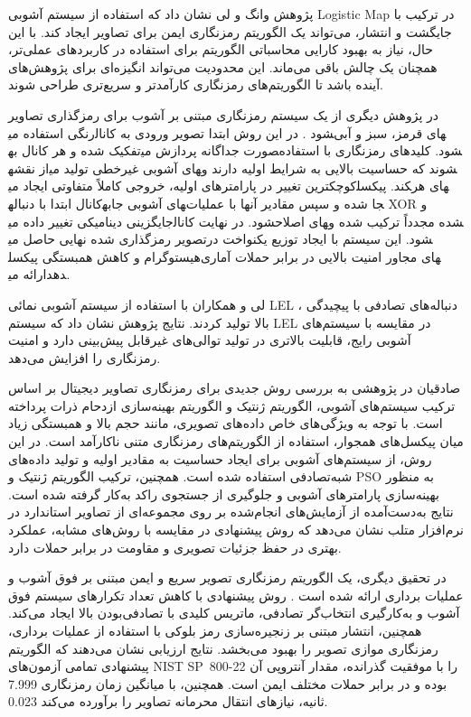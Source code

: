 پژوهش وانگ و لی \cite{ref8} نشان داد که استفاده از سیستم آشوبی ‎Logistic‎ ‎Map‎ در ترکیب با جایگشت و انتشار، می‌تواند یک الگوریتم رمزنگاری ایمن برای تصاویر ایجاد کند. با این حال، نیاز به بهبود کارایی محاسباتی الگوریتم برای استفاده در کاربردهای عملی‌تر، همچنان یک چالش باقی می‌ماند. این محدودیت می‌تواند انگیزه‌ای برای پژوهش‌های آینده باشد تا الگوریتم‌های رمزنگاری کارآمدتر و سریع‌تری طراحی شوند.

در پژوهش دیگری  از یک سیستم رمزنگاری مبتنی بر آشوب برای رمزگذاری تصاویر رنگی استفاده می‎شود \cite{ref9}. در این روش ابتدا تصویر ورودی به کانال‎های قرمز، سبز و آبی تفکیک شده و هر کانال به‎صورت جداگانه پردازش می‎شود. کلیدهای رمزنگاری با استفاده از نقشه‎های آشوبی غیرخطی تولید می‎شوند که حساسیت بالایی به شرایط اولیه دارند و کوچکترین تغییر در پارامترهای اولیه، خروجی کاملاً متفاوتی ایجاد می‎کند. پیکسل‎های هر کانال ابتدا با دنباله‎های آشوبی جابه‎جا شده و سپس مقادیر آنها با عملیات ‎XOR‎ و جایگزینی دینامیکی تغییر داده می‎شود. در نهایت کانال‎های اصلاح‎شده مجدداً ترکیب شده و تصویر رمزگذاری شده نهایی حاصل می‎شود. این سیستم با ایجاد توزیع یکنواخت در هیستوگرام و کاهش همبستگی پیکسل‎های مجاور امنیت بالایی در برابر حملات آماری ارائه می‎دهد.

لی و همکاران \cite{ref10} با استفاده از سیستم آشوبی نمائی ‎LEL‎ ، دنباله‌های تصادفی با پیچیدگی بالا تولید کردند. نتایج پژوهش نشان داد که سیستم ‎LEL‎ در مقایسه با سیستم‌های آشوبی رایج، قابلیت بالاتری در تولید توالی‌های غیرقابل پیش‌بینی دارد و امنیت رمزنگاری را افزایش می‌دهد.

صادقیان \cite{ref11} در پژوهشی به بررسی روش جدیدی برای رمزنگاری تصاویر دیجیتال بر اساس ترکیب سیستم‌های آشوبی، الگوریتم ژنتیک و الگوریتم بهینه‌سازی ازدحام ذرات پرداخته است.  با توجه به ویژگی‌های خاص داده‌های تصویری، مانند حجم بالا و همبستگی زیاد میان پیکسل‌های همجوار، استفاده از الگوریتم‌های رمزنگاری متنی ناکارآمد است. در این روش، از سیستم‌های آشوبی برای ایجاد حساسیت به مقادیر اولیه و تولید داده‌های شبه‌تصادفی استفاده شده است. همچنین، ترکیب الگوریتم ژنتیک و ‎PSO‎ به منظور بهینه‌سازی پارامترهای آشوبی و جلوگیری از جستجوی راکد به‌کار گرفته شده است. نتایج به‌دست‌آمده از آزمایش‌های انجام‌شده بر روی مجموعه‌ای از تصاویر استاندارد در نرم‌افزار متلب نشان می‌دهد که روش پیشنهادی در مقایسه با روش‌های مشابه، عملکرد بهتری در حفظ جزئیات تصویری و مقاومت در برابر حملات دارد.

در تحقیق دیگری، یک الگوریتم رمزنگاری تصویر سریع و ایمن مبتنی بر فوق آشوب و عملیات برداری ارائه شده است \cite{ref12}. روش پیشنهادی با کاهش تعداد تکرارهای سیستم فوق آشوب و به‌کارگیری انتخاب‌گر تصادفی، ماتریس کلیدی با تصادفی‌بودن بالا ایجاد می‌کند. همچنین، انتشار مبتنی بر زنجیره‌سازی رمز بلوکی با استفاده از عملیات برداری، رمزنگاری موازی تصویر را بهبود می‌بخشد. نتایج ارزیابی نشان می‌دهند که الگوریتم پیشنهادی تمامی آزمون‌های ‎NIST‎ ‎SP~800-22‎ را با موفقیت گذرانده، مقدار آنتروپی آن ‎7.999‎ بوده و در برابر حملات مختلف ایمن است. همچنین، با میانگین زمان رمزنگاری ‎0.023‎ ثانیه، نیازهای انتقال محرمانه تصاویر را برآورده می‌کند.

